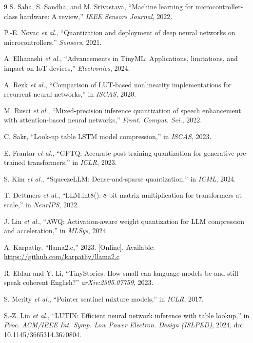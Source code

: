 \documentclass[10pt,journal]{IEEEtran}
\begin{document}
\begin{thebibliography}{9}
S. Saha, S. Sandha, and M. Srivastava, ``Machine learning for
microcontroller-class hardware: A review,'' \emph{IEEE Sensors Journal}, 2022.

P.-E. Novac \emph{et al.}, ``Quantization and deployment of deep neural
networks on microcontrollers,'' \emph{Sensors}, 2021.

A. Elhanashi \emph{et al.}, ``Advancements in TinyML: Applications,
limitations, and impact on IoT devices,'' \emph{Electronics}, 2024.

A. Rezk \emph{et al.}, ``Comparison of LUT-based nonlinearity implementations
for recurrent neural networks,'' in \emph{ISCAS}, 2020.

M. Rusci \emph{et al.}, ``Mixed-precision inference quantization of speech
enhancement with attention-based neural networks,'' \emph{Front. Comput. Sci.},
2022.

C. Sakr, ``Look-up table LSTM model compression,'' in \emph{ISCAS}, 2023.

E. Frantar \emph{et al.}, ``GPTQ: Accurate post-training quantization for
generative pre-trained transformers,'' in \emph{ICLR}, 2023.

S. Kim \emph{et al.}, ``SqueezeLLM: Dense-and-sparse quantization,'' in
\emph{ICML}, 2024.

T. Dettmers \emph{et al.}, ``LLM.int8(): 8-bit matrix multiplication for
transformers at scale,'' in \emph{NeurIPS}, 2022.

J. Lin \emph{et al.}, ``AWQ: Activation-aware weight quantization for LLM
compression and acceleration,'' in \emph{MLSys}, 2024.

A. Karpathy, ``llama2.c,'' 2023. [Online]. Available:
\url{https://github.com/karpathy/llama2.c}

R. Eldan and Y. Li, ``TinyStories: How small can language models be and still
speak coherent English?'' \emph{arXiv:2305.07759}, 2023.

S. Merity \emph{et al.}, ``Pointer sentinel mixture models,'' in \emph{ICLR},
2017.

S.-Z. Lin \emph{et al.}, ``LUTIN: Efficient neural network inference with
table lookup,'' in \emph{Proc. ACM/IEEE Int. Symp. Low Power Electron.
Design (ISLPED)}, 2024, doi: 10.1145/3665314.3670804.
\end{thebibliography}
\end{document}
